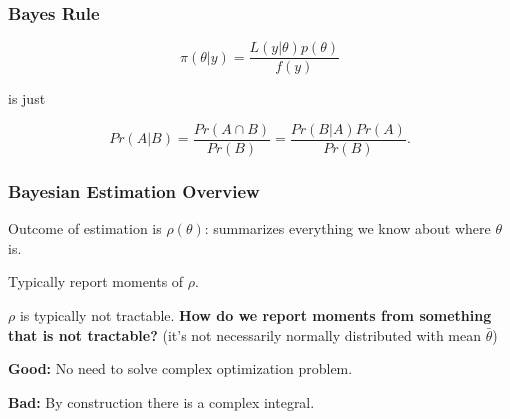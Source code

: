 \documentclass[11pt, aspectratio=169]{beamer}
\newenvironment{wideitemize}{\itemize\addtolength{\itemsep}{10pt}}{\enditemize}
\begin{document}
\begin{frame}[c]\frametitle{Bayes Rule}
    
$$\pi(\theta | y) = \frac{L(y | \theta) p(\theta)}{f(y)}$$ 

is just

$$Pr(A | B) = \frac{Pr(A \cap B)}{Pr(B)} = \frac{Pr(B|A) Pr(A)}{Pr(B)}.$$

\end{frame}


\begin{frame}[c]\frametitle{Bayesian Estimation Overview}
    
\begin{wideitemize}
    \item Outcome of estimation is $\rho(\theta)$: summarizes everything we know about where $\theta$ is.
    \item Typically report moments of $\rho$.
    \item $\rho$ is typically not tractable. \textbf{How do we report moments from something that is not tractable?} (it's not necessarily normally distributed with mean $\bar{\theta}$)
\end{wideitemize}    

\vspace{1em}
\textbf{Good:} No need to solve complex optimization problem.

\vspace{1em}
\textbf{Bad:} By construction there is a complex integral.

\end{frame}
\end{document}
